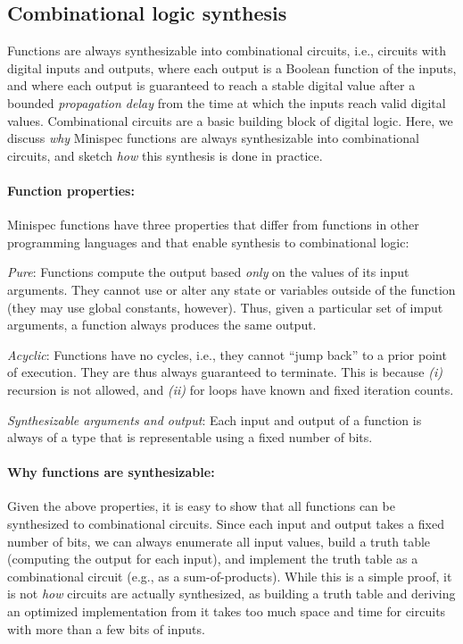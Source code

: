 \subsection{Combinational logic synthesis}
\label{sec:combinational}

Functions are always synthesizable into combinational circuits, i.e.,
circuits with digital inputs and outputs, where each output is a Boolean function of the inputs,
and where each output is guaranteed to reach a stable digital value after
a bounded \emph{propagation delay} from the time at which the inputs reach valid digital values.
Combinational circuits are a basic building block of digital logic.
Here, we discuss \emph{why} Minispec functions are always synthesizable into combinational circuits, and
sketch \emph{how} this synthesis is done in practice.

\paragraph{Function properties:}
Minispec functions have three properties that differ from
functions in other programming languages and that enable synthesis to combinational logic:
\begin{compactenum}
\item \emph{Pure}: Functions compute the output based \emph{only} on the values of its input arguments.
  They cannot use or alter any state or variables outside of the function
  (they may use global constants, however).
  Thus, given a particular set of imput arguments, a function always produces the same output.
\item \emph{Acyclic}: Functions have no cycles, i.e., they cannot ``jump back'' to a prior point of execution. 
  They are thus always guaranteed to terminate.
  This is because \emph{(i)} recursion is not allowed, and \emph{(ii)} for loops have known and fixed iteration counts.
\item \emph{Synthesizable arguments and output}: Each input and output of a function is always
  of a type that is representable using a fixed number of bits.
\end{compactenum}

\paragraph{Why functions are synthesizable:}
Given the above properties, it is easy to show that all functions can be synthesized to combinational circuits.
Since each input and output takes a fixed number of bits, we can always
enumerate all input values, build a truth table (computing the output for each input),
and implement the truth table as a combinational circuit (e.g., as a sum-of-products).
While this is a simple proof, it is not \emph{how} circuits are actually synthesized,
as building a truth table and deriving an optimized implementation from it
takes too much space and time for circuits with more than a few bits of inputs.

